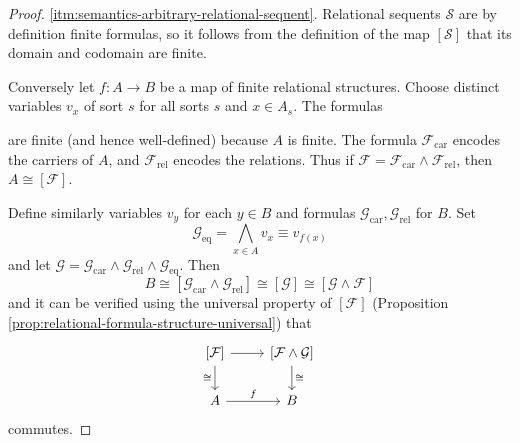 \documentclass[a4paper]{article}
\theoremstyle{remark}
\theoremstyle{definition}
\begin{document}
\begin{proof}
  \ref{itm:semantics-arbitrary-relational-sequent}.
  Relational sequents $\mathcal{S}$ are by definition finite formulas, so it follows from the definition of the map $[\mathcal{S}]$ that its domain and codomain are finite.

  Conversely let $f : A \rightarrow B$ be a map of finite relational structures.
  Choose distinct variables $v_x$ of sort $s$ for all sorts $s$ and $x \in A_s$.
  The formulas
  are finite (and hence well-defined) because $A$ is finite.
  The formula $\mathcal{F}_{\mathrm{car}}$ encodes the carriers of $A$, and $\mathcal{F}_{\mathrm{rel}}$ encodes the relations.
  Thus if $\mathcal{F} = \mathcal{F}_{\mathrm{car}} \land \mathcal{F}_{\mathrm{rel}}$, then $A \cong [\mathcal{F}]$.

  Define similarly variables $v_y$ for each $y \in B$ and formulas $\mathcal{G}_{\mathrm{car}}, \mathcal{G}_{\mathrm{rel}}$ for $B$.
  Set
  \begin{equation}
    \mathcal{G}_\mathrm{eq} = \bigwedge_{x \in A} v_x \equiv v_{f(x)}
  \end{equation}
  and let $\mathcal{G} = \mathcal{G}_{\mathrm{car}} \land \mathcal{G}_{\mathrm{rel}} \land \mathcal{G}_{\mathrm{eq}}$.
  Then
  \begin{equation}
    B \cong [\mathcal{G}_{\mathrm{car}} \land \mathcal{G}_{\mathrm{rel}}] \cong [\mathcal{G}] \cong [\mathcal{G} \land \mathcal{F}]
  \end{equation}
  and it can be verified using the universal property of $[\mathcal{F}]$ (Proposition \ref{prop:relational-formula-structure-universal}) that
  \begin{equation}
    \begin{tikzcd}
      \left[\mathcal{F}\right] \arrow[r] \arrow[d, "\cong"'] & \left[\mathcal{F} \land \mathcal{G} \right] \arrow[d, "\cong"] \\
      A \arrow[r, "f"] & B
    \end{tikzcd}
  \end{equation}
  commutes.


\end{proof}
\end{document}
